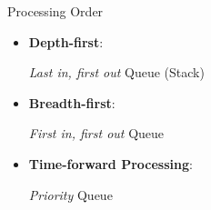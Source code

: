 \documentclass[english, aspectratio=169]{beamer}
\begin{document}
%
%
%
\begin{frame}
  \Large

  Processing Order
  \begin{itemize}
  \item \textbf{Depth-first}:

    \emph{Last in, first out} Queue (Stack)

  \item \textbf{Breadth-first}:

    \emph{First in, first out} Queue

    \pause

  \item \textbf{Time-forward Processing}:

    \emph{Priority} Queue
  \end{itemize}
\end{frame}
\end{document}
